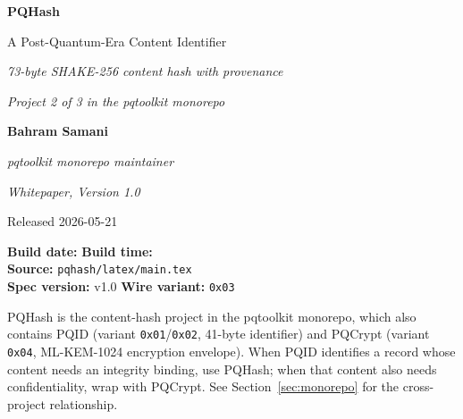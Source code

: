 \documentclass[11pt,letterpaper]{article}
\newcommand{\pqhash}{\textsf{PQHash}}
\newcommand{\pqid}{\textsf{PQID}}
\newcommand{\pqcrypt}{\textsf{PQCrypt}}
\newcommand{\pqtoolkit}{\textsf{pqtoolkit}}
\newcommand{\code}[1]{\texttt{#1}}
\begin{document}

\begin{titlepage}
  \centering
  \vspace*{2.0cm}
  {\Huge\bfseries PQHash\par}
  \vspace{0.6cm}
  {\Large A Post-Quantum-Era Content Identifier\par}
  \vspace{0.3cm}
  {\large\itshape 73-byte SHAKE-256 content hash with provenance\par}
  \vspace{0.3cm}
  {\large\itshape Project 2 of 3 in the \pqtoolkit{} monorepo\par}
  \vspace{1.4cm}
  {\large\bfseries Bahram Samani\par}
  \vspace{0.4em}
  {\small\itshape \pqtoolkit{} monorepo maintainer\par}
  \vspace{1.4cm}
  {\large\itshape Whitepaper, Version 1.0\par}
  \vspace{0.3em}
  {\small Released 2026-05-21\par}
  \vspace{1.4cm}
  \begin{tcolorbox}[colback=gray!5,colframe=black!30,width=0.78\textwidth]
    \centering\small
    \textbf{Build date:} \buildDate \quad\textbf{Build time:} \buildTime\\[0.4em]
    \textbf{Source:} \texttt{pqhash/latex/main.tex}\\[0.4em]
    \textbf{Spec version:} v1.0 \quad\textbf{Wire variant:} \texttt{0x03}
  \end{tcolorbox}
  \vfill
  {\small \pqhash{} is the content-hash project in the \pqtoolkit{} monorepo, which also contains \pqid{} (variant \code{0x01}/\code{0x02}, 41-byte identifier) and \pqcrypt{} (variant \code{0x04}, ML-KEM-1024 encryption envelope). When \pqid{} identifies a record whose content needs an integrity binding, use \pqhash{}; when that content also needs confidentiality, wrap with \pqcrypt{}. See Section~\ref{sec:monorepo} for the cross-project relationship.\par}
  \vspace{0.5cm}
\end{titlepage}

\setcounter{tocdepth}{2}
\tableofcontents
\newpage














\end{document}
